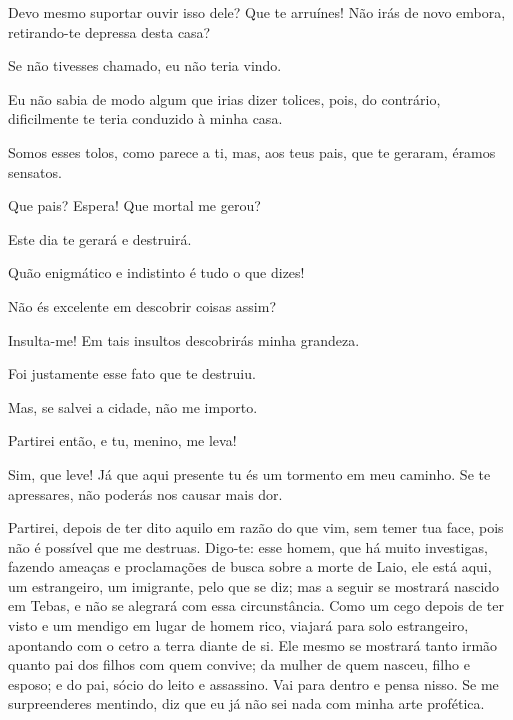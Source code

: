    Devo mesmo suportar  ouvir isso dele? Que te arruínes! Não irás de
novo embora, retirando-te depressa desta casa?

   Se não tivesses chamado, eu não teria vindo.

   Eu não sabia de modo algum que irias dizer tolices, pois, do contrário,
dificilmente te teria conduzido à minha casa.

   Somos esses tolos, como parece a ti, mas, aos teus pais, que te geraram,
éramos sensatos.

   Que pais? Espera! Que mortal me gerou?

   Este dia te gerará e destruirá.

   Quão enigmático e indistinto é tudo o que dizes!

   Não és excelente  em descobrir coisas assim?

   Insulta-me! Em tais insultos descobrirás minha grandeza.

   Foi justamente esse fato que te destruiu.

   Mas, se salvei a cidade, não me importo.

   Partirei então, e tu, menino, me leva!

   Sim, que leve! Já que aqui presente tu és um tormento em meu caminho. Se
te apressares, não poderás nos causar mais dor.

   Partirei, depois de ter dito aquilo em razão do que vim, sem temer tua
face, pois não é possível que me destruas. Digo-te: esse homem,
que há muito investigas, fazendo ameaças e proclamações de busca sobre a
morte de Laio, ele está aqui, um estrangeiro, um imigrante, pelo que se
diz; mas a seguir se mostrará nascido em Tebas, e não se alegrará com
essa circunstância. Como um cego depois de ter visto e um mendigo em
lugar de homem rico, viajará para solo estrangeiro, apontando com o
cetro a terra diante de si. Ele mesmo se mostrará tanto irmão quanto
pai dos filhos com quem convive; da mulher de quem nasceu, filho e
esposo; e do pai, sócio do leito e assassino. Vai para dentro e pensa
nisso. Se me surpreenderes mentindo, diz que eu já não sei nada com
minha arte profética.


